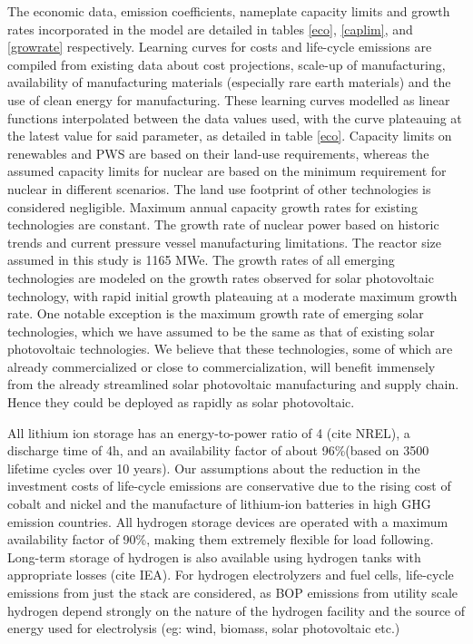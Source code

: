 The economic data, emission coefficients, nameplate capacity limits and growth rates incorporated in the model are detailed in tables \ref{eco}, \ref{caplim}, and \ref{growrate} respectively. Learning curves for costs and life-cycle emissions are compiled from existing data about cost projections, scale-up of manufacturing, availability of manufacturing materials (especially rare earth materials) and the use of clean energy for manufacturing. These learning curves modelled as linear functions interpolated between the data values used, with the curve plateauing at the latest value for said parameter, as detailed in table \ref{eco}. Capacity limits on renewables and \gls{PWS} are based on their land-use requirements, whereas the assumed capacity limits for nuclear are based on the minimum requirement for nuclear in different scenarios. The land use footprint of other technologies is considered negligible. Maximum annual capacity growth rates for existing technologies are constant. The growth rate of nuclear power based on historic trends and current pressure vessel manufacturing limitations. The reactor size assumed in this study is 1165 MWe. The growth rates of all emerging technologies are modeled on the growth rates observed for solar photovoltaic technology, with rapid initial growth plateauing at a moderate maximum growth rate. One notable exception is the maximum growth rate of emerging solar technologies, which we have assumed to be the same as that of existing solar photovoltaic technologies. We believe that these technologies, some of which are already commercialized or close to commercialization,  will benefit immensely from the already streamlined solar photovoltaic manufacturing and supply chain. Hence they could be deployed as rapidly as solar photovoltaic. 

All lithium ion storage has an energy-to-power ratio of 4 (cite NREL), a discharge time of 4h, and an availability factor of about 96\%(based on 3500 lifetime cycles over 10 years). Our assumptions about the reduction in the investment costs of life-cycle emissions are conservative due to the rising cost of cobalt and nickel and the manufacture of lithium-ion batteries in high \gls{GHG} emission countries. All hydrogen storage devices are operated with a maximum availability factor of 90\%, making them extremely flexible for load following. Long-term storage of hydrogen is also available using hydrogen tanks with appropriate losses (cite IEA). For hydrogen electrolyzers and fuel cells, life-cycle emissions from just the stack are considered, as \gls{BOP} emissions from utility scale hydrogen depend strongly on the nature of the hydrogen facility and the source of energy used for electrolysis (eg: wind, biomass, solar photovoltaic etc.)


